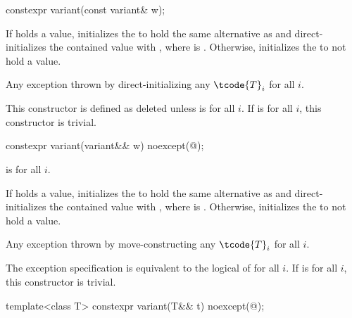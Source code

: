 %
\begin{itemdecl}
constexpr variant(const variant& w);
\end{itemdecl}

\begin{itemdescr}
\pnum
\effects
If  holds a value, initializes the  to hold the same
alternative as  and direct-initializes the contained value
with , where  is .
Otherwise, initializes the  to not hold a value.

\pnum
\throws
Any exception thrown by direct-initializing any $\tcode{T}_i$ for all $i$.

\pnum
\remarks
This constructor is defined as deleted unless
 is  for all $i$.
If 
is  for all $i$, this constructor is trivial.
\end{itemdescr}

%
\begin{itemdecl}
constexpr variant(variant&& w) noexcept(@\seebelow@);
\end{itemdecl}

\begin{itemdescr}
\pnum
\constraints
{} is  for all $i$.

\pnum
\effects
If  holds a value, initializes the  to hold the same
alternative as  and direct-initializes the contained value with
, where  is .
Otherwise, initializes the  to not hold a value.

\pnum
\throws
Any exception thrown by move-constructing any $\tcode{T}_i$ for all $i$.

\pnum
\remarks
The exception specification is equivalent to the logical  of
 for all $i$.
If 
is  for all $i$, this constructor is trivial.
\end{itemdescr}

%
\begin{itemdecl}
template<class T> constexpr variant(T&& t) noexcept(@\seebelow@);
\end{itemdecl}

